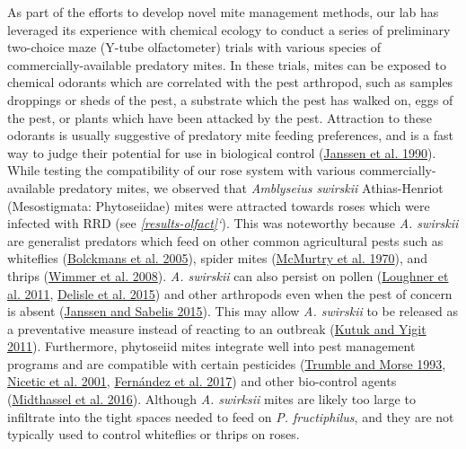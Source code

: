 \documentclass[12pt,final,CPage]{ufthesis}
\begin{document}
{  As part of the efforts to develop novel mite management methods, our lab has leveraged its experience with chemical ecology to conduct a series of preliminary two-choice maze (Y-tube olfactometer) trials with various species of commercially-available predatory mites. In these trials, mites can be exposed to chemical odorants which are correlated with the pest arthropod, such as samples droppings or sheds of the pest, a substrate which the pest has walked on, eggs of the pest, or plants which have been attacked by the pest. Attraction to these odorants is usually suggestive of predatory mite feeding preferences, and is a fast way to judge their potential for use in biological control (\protect\hyperlink{ref-Janssen1990}{Janssen et al. 1990}). While testing the compatibility of our rose system with various commercially-available predatory mites, we observed that \emph{Amblyseius swirskii} Athias-Henriot (Mesostigmata: Phytoseiidae) mites were attracted towards roses which were infected with RRD (see \emph{\ref{results-olfact}`}). This was noteworthy because \emph{A. swirskii} are generalist predators which feed on other common agricultural pests such as whiteflies (\protect\hyperlink{ref-Bolckmans2005}{Bolckmans et al. 2005}), spider mites (\protect\hyperlink{ref-McMurtry1970}{McMurtry et al. 1970}), and thrips (\protect\hyperlink{ref-Wimmer2008}{Wimmer et al. 2008}). \emph{A. swirskii} can also persist on pollen (\protect\hyperlink{ref-Loughner2011}{Loughner et al. 2011}, \protect\hyperlink{ref-Delisle2015}{Delisle et al. 2015}) and other arthropods even when the pest of concern is absent (\protect\hyperlink{ref-Janssen2015}{Janssen and Sabelis 2015}). This may allow \emph{A. swirskii} to be released as a preventative measure instead of reacting to an outbreak (\protect\hyperlink{ref-Kutuk2011}{Kutuk and Yigit 2011}). Furthermore, phytoseiid mites integrate well into pest management programs and are compatible with certain pesticides (\protect\hyperlink{ref-Trumble1993}{Trumble and Morse 1993}, \protect\hyperlink{ref-Nicetic2001}{Nicetic et al. 2001}, \protect\hyperlink{ref-Fernandez2017}{Fernández et al. 2017}) and other bio-control agents (\protect\hyperlink{ref-Midthassel2016}{Midthassel et al. 2016}). Although \emph{A. swirksii} mites are likely too large to infiltrate into the tight spaces needed to feed on \emph{P. fructiphilus}, and they are not typically used to control whiteflies or thrips on roses.

}
\end{document}
